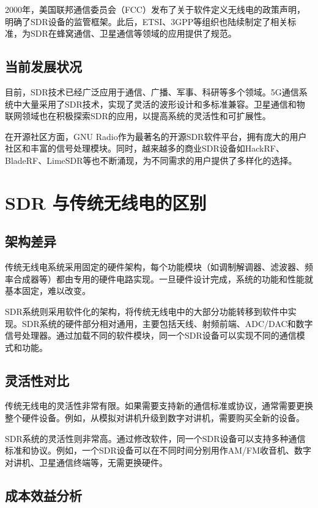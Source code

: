 ﻿\documentclass[UTF8]{ctexbook}
\begin{document}
2000年，美国联邦通信委员会（FCC）发布了关于软件定义无线电的政策声明，明确了SDR设备的监管框架。此后，ETSI、3GPP等组织也陆续制定了相关标准，为SDR在蜂窝通信、卫星通信等领域的应用提供了规范。

\subsection{当前发展状况}

目前，SDR技术已经广泛应用于通信、广播、军事、科研等多个领域。5G通信系统中大量采用了SDR技术，实现了灵活的波形设计和多标准兼容。卫星通信和物联网领域也在积极探索SDR的应用，以提高系统的灵活性和可扩展性。

在开源社区方面，GNU Radio作为最著名的开源SDR软件平台，拥有庞大的用户社区和丰富的信号处理模块。同时，越来越多的商业SDR设备如HackRF、BladeRF、LimeSDR等也不断涌现，为不同需求的用户提供了多样化的选择。
\section{SDR 与传统无线电的区别}

\subsection{架构差异}

传统无线电系统采用固定的硬件架构，每个功能模块（如调制解调器、滤波器、频率合成器等）都由专用的硬件电路实现。一旦硬件设计完成，系统的功能和性能就基本固定，难以改变。

SDR系统则采用软件化的架构，将传统无线电中的大部分功能转移到软件中实现。SDR系统的硬件部分相对通用，主要包括天线、射频前端、ADC/DAC和数字信号处理器。通过加载不同的软件模块，同一个SDR设备可以实现不同的通信模式和功能。

\subsection{灵活性对比}

传统无线电的灵活性非常有限。如果需要支持新的通信标准或协议，通常需要更换整个硬件设备。例如，从模拟对讲机升级到数字对讲机，需要购买全新的设备。

SDR系统的灵活性则非常高。通过修改软件，同一个SDR设备可以支持多种通信标准和协议。例如，一个SDR设备可以在不同时间分别用作AM/FM收音机、数字对讲机、卫星通信终端等，无需更换硬件。

\subsection{成本效益分析}
\end{document}
